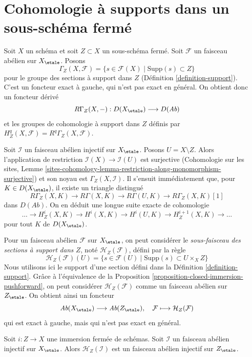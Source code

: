 \section{Cohomologie à supports dans un sous-schéma fermé}
\label{section-cohomology-support}

\noindent
Soit $X$ un schéma et soit $Z \subset X$ un sous-schéma fermé.
Soit $\mathcal{F}$ un faisceau abélien sur $X_\etale$. Posons
$$
\Gamma_Z(X, \mathcal{F}) =
\{s \in \mathcal{F}(X) \mid \text{Supp}(s) \subset Z\}
$$
pour le groupe des sections à support dans $Z$ (Définition \ref{definition-support}).
C'est un foncteur exact à gauche, qui n'est pas exact en général.
On obtient donc un foncteur dérivé
$$
R\Gamma_Z(X, -) : D(X_\etale) \longrightarrow D(\textit{Ab})
$$
et les groupes de cohomologie à support dans $Z$ définis par
$H^q_Z(X, \mathcal{F}) = R^q\Gamma_Z(X, \mathcal{F})$.

\medskip\noindent
Soit $\mathcal{I}$ un faisceau abélien injectif sur $X_\etale$.
Posons $U = X \setminus Z$.
Alors l'application de restriction $\mathcal{I}(X) \to \mathcal{I}(U)$ est surjective
(Cohomologie sur les sites, Lemme
\ref{sites-cohomology-lemma-restriction-along-monomorphism-surjective})
et son noyau est $\Gamma_Z(X, \mathcal{I})$. Il s'ensuit immédiatement que,
pour $K \in D(X_\etale)$, il existe un triangle distingué
$$
R\Gamma_Z(X, K) \to R\Gamma(X, K) \to R\Gamma(U, K) \to R\Gamma_Z(X, K)[1]
$$
dans $D(\textit{Ab})$. On en déduit une longue suite exacte de
cohomologie
$$
\ldots \to H^i_Z(X, K) \to H^i(X, K) \to H^i(U, K) \to
H^{i + 1}_Z(X, K) \to \ldots
$$
pour tout $K$ de $D(X_\etale)$.

\medskip\noindent
Pour un faisceau abélien $\mathcal{F}$ sur $X_\etale$, on peut considérer
le {\it sous-faisceau des sections à support dans $Z$}, noté
$\mathcal{H}_Z(\mathcal{F})$, défini par la règle
$$
\mathcal{H}_Z(\mathcal{F})(U) =
\{s \in \mathcal{F}(U) \mid \text{Supp}(s) \subset U \times_X Z\}
$$
Nous utilisons ici le support d'une section défini dans la
Définition \ref{definition-support}. Grâce à l'équivalence de la
Proposition \ref{proposition-closed-immersion-pushforward},
on peut considérer $\mathcal{H}_Z(\mathcal{F})$ comme un faisceau abélien sur
$Z_\etale$. On obtient ainsi un foncteur
$$
\textit{Ab}(X_\etale) \longrightarrow \textit{Ab}(Z_\etale),\quad
\mathcal{F} \longmapsto \mathcal{H}_Z(\mathcal{F})
$$
qui est exact à gauche, mais qui n'est pas exact en général.

\begin{lemma}
\label{lemma-sections-with-support-acyclic}
Soit $i : Z \to X$ une immersion fermée de schémas.
Soit $\mathcal{I}$ un faisceau abélien injectif sur $X_\etale$.
Alors $\mathcal{H}_Z(\mathcal{I})$ est un faisceau abélien injectif
sur $Z_\etale$.
\end{lemma}

